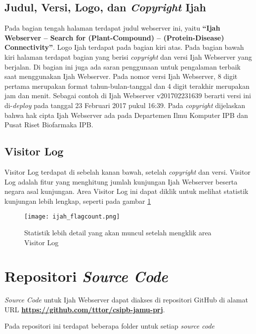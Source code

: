 	\subsection{Judul, Versi, Logo, dan \emph{Copyright} Ijah} \label{ssec:judul}
	Pada bagian tengah halaman terdapat judul webserver ini, yaitu \textbf{``Ijah Webserver -- Search for (Plant-Compound) -- (Protein-Disease) Connectivity''}. Logo Ijah terdapat pada bagian kiri atas. Pada bagian bawah kiri halaman terdapat bagian yang berisi \emph{copyright} dan versi Ijah Webserver yang berjalan. Di bagian ini juga ada saran penggunaan untuk pengalaman terbaik saat menggunakan Ijah Webserver. Pada nomor versi Ijah Webserver, 8 digit pertama merupakan format tahun-bulan-tanggal dan 4 digit terakhir merupakan jam dan menit. Sebagai contoh di Ijah Webserver v201702231639 berarti versi ini di-\emph{deploy} pada tanggal 23 Februari 2017 pukul 16:39. Pada \emph{copyright} dijelaskan bahwa hak cipta Ijah Webserver ada pada Departemen Ilmu Komputer IPB dan Pusat Riset Biofarmaka IPB.


	\subsection{Visitor Log} \label{ssec:visitor log}
	Visitor Log terdapat di sebelah kanan bawah, setelah \emph{copyright} dan versi. Visitor Log adalah fitur yang menghitung jumlah kunjungan Ijah Webserver beserta negara asal kunjungan. Area Visitor Log ini dapat diklik untuk melihat statistik kunjungan lebih lengkap, seperti pada gambar \ref{fig:ijah_flagcount}

	\begin{figure}[H]
	\centering
	\texttt{[image: ijah\_flagcount.png]}
	\caption{Statistik lebih detail yang akan muncul setelah mengklik area Visitor Log}
	\label{fig:ijah_flagcount}
	\end{figure}

\section{Repositori \emph{Source Code}} \label{sec:ws_source}
\emph{Source Code} untuk Ijah Webserver dapat diakses di repositori GitHub di alamat URL \href{https://github.com/tttor/csipb-jamu-prj}{\textbf{https://github.com/tttor/csipb-jamu-prj}}.

Pada repositori ini terdapat beberapa folder untuk setiap \emph{source code}


